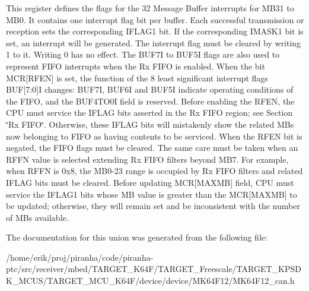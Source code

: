 This register defines the flags for the 32 Message Buffer interrupts for M\+B31 to M\+B0. It contains one interrupt flag bit per buffer. Each successful transmission or reception sets the corresponding I\+F\+L\+A\+G1 bit. If the corresponding I\+M\+A\+S\+K1 bit is set, an interrupt will be generated. The interrupt flag must be cleared by writing 1 to it. Writing 0 has no effect. The B\+U\+F7I to B\+U\+F5I flags are also used to represent F\+I\+FO interrupts when the Rx F\+I\+FO is enabled. When the bit M\+CR\mbox{[}R\+F\+EN\mbox{]} is set, the function of the 8 least significant interrupt flags B\+UF\mbox{[}7\+:0\mbox{]}I changes\+: B\+U\+F7I, B\+U\+F6I and B\+U\+F5I indicate operating conditions of the F\+I\+FO, and the B\+U\+F4\+T\+O0I field is reserved. Before enabling the R\+F\+EN, the C\+PU must service the I\+F\+L\+AG bits asserted in the Rx F\+I\+FO region; see Section \char`\"{}\+Rx
\+F\+I\+F\+O\char`\"{}. Otherwise, these I\+F\+L\+AG bits will mistakenly show the related M\+Bs now belonging to F\+I\+FO as having contents to be serviced. When the R\+F\+EN bit is negated, the F\+I\+FO flags must be cleared. The same care must be taken when an R\+F\+FN value is selected extending Rx F\+I\+FO filters beyond M\+B7. For example, when R\+F\+FN is 0x8, the M\+B0-\/23 range is occupied by Rx F\+I\+FO filters and related I\+F\+L\+AG bits must be cleared. Before updating M\+CR\mbox{[}M\+A\+X\+MB\mbox{]} field, C\+PU must service the I\+F\+L\+A\+G1 bits whose MB value is greater than the M\+CR\mbox{[}M\+A\+X\+MB\mbox{]} to be updated; otherwise, they will remain set and be inconsistent with the number of M\+Bs available. 

The documentation for this union was generated from the following file\+:\begin{DoxyCompactItemize}
\item 
/home/erik/proj/piranha/code/piranha-\/ptc/src/receiver/mbed/\+T\+A\+R\+G\+E\+T\+\_\+\+K64\+F/\+T\+A\+R\+G\+E\+T\+\_\+\+Freescale/\+T\+A\+R\+G\+E\+T\+\_\+\+K\+P\+S\+D\+K\+\_\+\+M\+C\+U\+S/\+T\+A\+R\+G\+E\+T\+\_\+\+M\+C\+U\+\_\+\+K64\+F/device/device/\+M\+K64\+F12/M\+K64\+F12\+\_\+can.\+h\end{DoxyCompactItemize}
